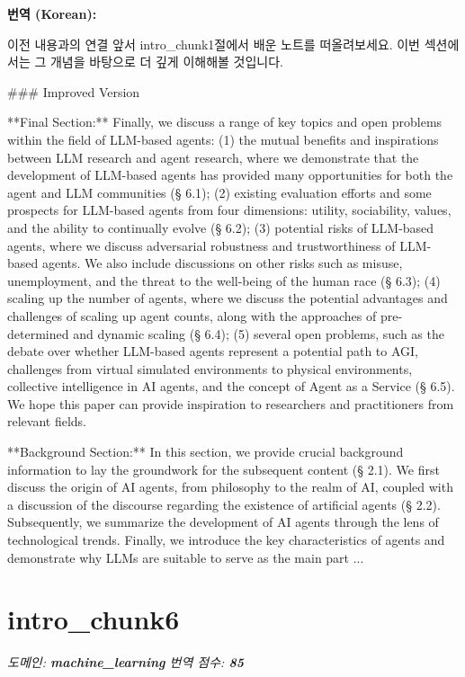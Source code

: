 \documentclass[12pt,a4paper]{article}
\begin{document}
\begin{mdframed}[style=ko]
\noindent\textbf{\small 번역 (Korean):}\\[2pt]
\begin{linkbox}{이전 내용과의 연결}
  앞서 intro_chunk1절에서 배운 노트를 떠올려보세요. 이번 섹션에서는 그 개념을 바탕으로 더 깊게 이해해볼 것입니다.
\end{linkbox}
### Improved Version

**Final Section:**
Finally, we discuss a range of key topics and open problems within the field of LLM-based agents: (1) the mutual benefits and inspirations between LLM research and agent research, where we demonstrate that the development of LLM-based agents has provided many opportunities for both the agent and LLM communities (§ 6.1); (2) existing evaluation efforts and some prospects for LLM-based agents from four dimensions: utility, sociability, values, and the ability to continually evolve (§ 6.2); (3) potential risks of LLM-based agents, where we discuss adversarial robustness and trustworthiness of LLM-based agents. We also include discussions on other risks such as misuse, unemployment, and the threat to the well-being of the human race (§ 6.3); (4) scaling up the number of agents, where we discuss the potential advantages and challenges of scaling up agent counts, along with the approaches of pre-determined and dynamic scaling (§ 6.4); (5) several open problems, such as the debate over whether LLM-based agents represent a potential path to AGI, challenges from virtual simulated environments to physical environments, collective intelligence in AI agents, and the concept of Agent as a Service (§ 6.5). We hope this paper can provide inspiration to researchers and practitioners from relevant fields.

**Background Section:**
In this section, we provide crucial background information to lay the groundwork for the subsequent content (§ 2.1). We first discuss the origin of AI agents, from philosophy to the realm of AI, coupled with a discussion of the discourse regarding the existence of artificial agents (§ 2.2). Subsequently, we summarize the development of AI agents through the lens of technological trends. Finally, we introduce the key characteristics of agents and demonstrate why LLMs are suitable to serve as the main part ...
\end{mdframed}
\vspace{1em}

\section{intro\_chunk6}
\noindent\textit{\small 도메인: \textbf{machine\_learning} \quad 번역 점수: \textbf{\color{green!60!black}85}}
\vspace{0.5em}
\end{document}
